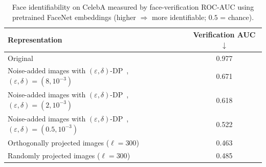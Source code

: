 \documentclass[final,3p,times]{elsarticle}
\theoremstyle{plain}
\begin{document}
\begin{table}[t]
\centering
\caption{Face identifiability on CelebA measured by face-verification ROC-AUC using pretrained FaceNet embeddings (higher $\Rightarrow$ more identifiable; $0.5$ = chance).}
\label{tab: celeba-identifiability}
\begin{tabular}{lc}
\toprule
Representation & Verification AUC $\downarrow$\\
\midrule
Original & 0.977 \\
Noise-added images with \((\varepsilon,\delta)\)-DP~\cite{analyticalgaussianmechanism}, \((\varepsilon,\delta)=(8,10^{-3})\) & 0.671 \\
Noise-added images with \((\varepsilon,\delta)\)-DP~\cite{analyticalgaussianmechanism}, \((\varepsilon,\delta)=(2,10^{-3})\) & 0.618 \\
Noise-added images with \((\varepsilon,\delta)\)-DP~\cite{analyticalgaussianmechanism}, \((\varepsilon,\delta)=(0.5,10^{-3})\)  & 0.522 \\
Orthogonally projected images (\(\ell=300\))   & 0.463 \\
Randomly projected images (\(\ell=300\))       & 0.485 \\
\bottomrule
\end{tabular}
\end{table}
\end{document}
